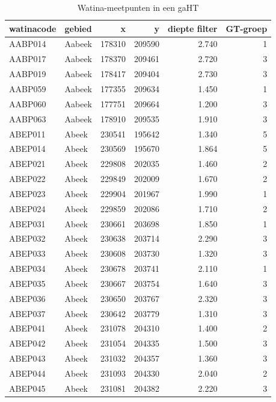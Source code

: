 \documentclass[11pt,]{book}
\begin{document}
\begin{table}

\caption{\label{tab:tabel-Watina-in-gaHT}Watina-meetpunten in een gaHT}
\centering
\begin{tabular}[t]{l|l|r|r|r|r}
\hline
watinacode & gebied & x & y & diepte filter & GT-groep\\
\hline
AABP014 & Aabeek & 178310 & 209590 & 2.740 & 1\\
\hline
AABP017 & Aabeek & 178370 & 209461 & 2.720 & 3\\
\hline
AABP019 & Aabeek & 178417 & 209404 & 2.730 & 3\\
\hline
AABP059 & Aabeek & 177355 & 209634 & 1.450 & 1\\
\hline
AABP060 & Aabeek & 177751 & 209664 & 1.200 & 3\\
\hline
AABP063 & Aabeek & 178910 & 209535 & 1.910 & 3\\
\hline
ABEP011 & Abeek & 230541 & 195642 & 1.340 & 5\\
\hline
ABEP014 & Abeek & 230569 & 195670 & 1.864 & 5\\
\hline
ABEP021 & Abeek & 229808 & 202035 & 1.460 & 2\\
\hline
ABEP022 & Abeek & 229849 & 202009 & 1.670 & 2\\
\hline
ABEP023 & Abeek & 229904 & 201967 & 1.990 & 1\\
\hline
ABEP024 & Abeek & 229859 & 202086 & 1.710 & 2\\
\hline
ABEP031 & Abeek & 230661 & 203698 & 1.850 & 1\\
\hline
ABEP032 & Abeek & 230638 & 203714 & 2.290 & 3\\
\hline
ABEP033 & Abeek & 230608 & 203730 & 1.320 & 3\\
\hline
ABEP034 & Abeek & 230678 & 203741 & 2.110 & 1\\
\hline
ABEP035 & Abeek & 230667 & 203754 & 1.640 & 3\\
\hline
ABEP036 & Abeek & 230650 & 203767 & 2.320 & 3\\
\hline
ABEP037 & Abeek & 230642 & 203779 & 1.310 & 3\\
\hline
ABEP041 & Abeek & 231078 & 204310 & 1.400 & 2\\
\hline
ABEP042 & Abeek & 231054 & 204335 & 1.500 & 3\\
\hline
ABEP043 & Abeek & 231032 & 204357 & 1.360 & 3\\
\hline
ABEP044 & Abeek & 231093 & 204330 & 2.040 & 2\\
\hline
ABEP045 & Abeek & 231081 & 204382 & 2.220 & 3\\

\end{tabular}
\end{table}
\end{document}
